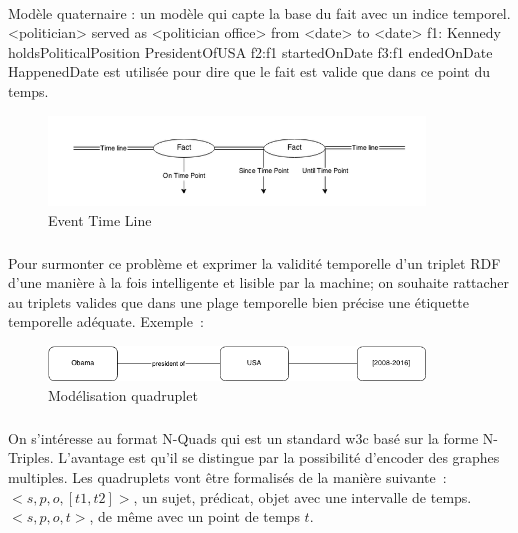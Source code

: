 \paragraph{}
Modèle quaternaire : un modèle qui capte la base du fait avec un indice temporel.
\newline
<politician> served as <politician office> from <date> to <date>
\newline
f1: Kennedy holdsPoliticalPosition PresidentOfUSA 
\newline
f2:f1 startedOnDate 
\newline
f3:f1 endedOnDate
\newline
HappenedDate est utilisée pour dire que le fait est valide que dans ce point du temps.
\begin{figure}[H]
        \centering
                \centering
                \includegraphics[width=10cm]{timeline.png}
               \caption{Event Time Line}

\end{figure}
\subparagraph{}
Pour surmonter ce problème et exprimer la validité temporelle d’un triplet RDF d’une manière à la fois intelligente et lisible par la machine; on souhaite rattacher au triplets valides que dans une plage temporelle bien précise une étiquette temporelle adéquate.
\newline
Exemple~:
\begin{figure}[H]
        \centering
                \centering
                \includegraphics[width=10cm]{obamaQuad.png}
               \caption{Modélisation quadruplet}

\end{figure}
\subparagraph{}
On s'intéresse au format N-Quads qui est un standard w3c basé sur la forme N-Triples. L’avantage est qu’il se distingue par la possibilité d’encoder des graphes multiples.
Les quadruplets vont être formalisés de la manière suivante~:
\newline
$<s,p,o,[t1,t2]>$, un sujet, prédicat, objet avec une intervalle de temps.
\newline
$<s,p,o,t>$, de même avec un point de temps $t$.
